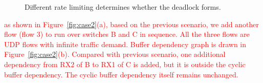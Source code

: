 \begin{figure}[t]
\centering

\vspace{-0.15in}
\caption{Different rate limiting determines whether the deadlock forms.}
\vspace{-0.15in}
\label{fig:case3}
\end{figure}


 \textcolor{red}{as shown in Figure~\ref{fig:case2}(a), based on the previous scenario, we
add another flow (flow 3) to run over switches B and C in sequence. All the three flows are UDP
flows with infinite traffic demand. Buffer dependency graph is drawn in Figure~\ref{fig:case2}(b).
Compared with previous scenario, one additional dependency from RX2 of B to RX1 of C is added, but it
is outside the cyclic buffer dependency. The cyclic buffer dependency itself remains unchanged.}

